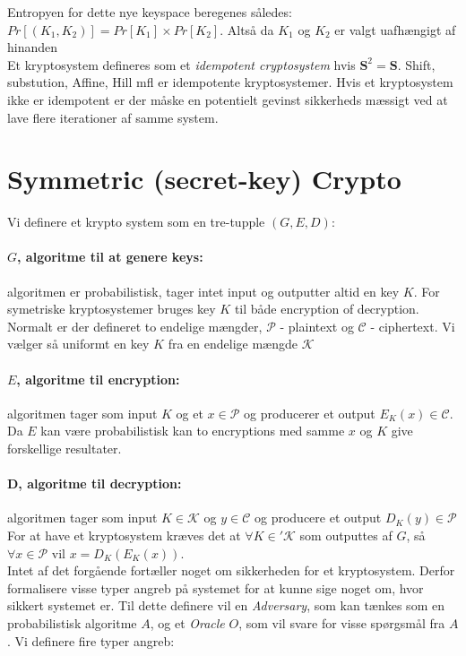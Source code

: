 \documentclass[paper=a4, fontsize=11pt]{scrartcl} %
\numberwithin{equation}{section} %
\numberwithin{figure}{section} %
\numberwithin{table}{section} %
\begin{document}
	Entropyen for dette nye keyspace beregenes således: $Pr[(K_1,K_2)]=Pr[K_1]\times Pr[K_2]$. Altså da $K_1$ og $K_2$ er valgt uafhængigt af hinanden \\
	
	Et kryptosystem defineres som et \textit{idempotent cryptosystem} hvis $\mathbf{S}^2=\mathbf{S}$. Shift, substution, Affine, Hill mfl er idempotente kryptosystemer. Hvis et kryptosystem ikke er idempotent er der måske en potentielt gevinst sikkerheds mæssigt ved at lave flere iterationer af samme system. 
	
	\newpage
	
	\section{Symmetric (secret-key) Crypto}
	
	Vi definere et krypto system som en tre-tupple $(G,E,D)$: 
	
	\paragraph{\textbf{$G$, algoritme til at genere keys:}} algoritmen er probabilistisk, tager intet input og outputter altid en key $K$. For symetriske kryptosystemer bruges key $K$ til både encryption of decryption. Normalt er der defineret to endelige mængder, $\mathcal{P}$ - plaintext og $\mathcal{C}$ - ciphertext. Vi vælger så uniformt en key $K$ fra en endelige mængde $\mathcal{K}$
	\paragraph{\textbf{$E$, algoritme til encryption:}} algoritmen tager som input $K$ og et $x\in\mathcal{P}$ og producerer et output $E_K(x)\in\mathcal{C}$. Da $E$ kan være probabilistisk kan to encryptions med samme $x$ og $K$ give forskellige resultater.
	\paragraph{\textbf{D, algoritme til decryption:}} algoritmen tager som input $K\in\mathcal{K}$ og $y\in\mathcal{C}$ og producere et output $D_K(y)\in\mathcal{P}$ \\

	For at have et kryptosystem kræves det at $\forall K\in\mathcal{'K}$ som outputtes af $G$, så $\forall x\in\mathcal{P}$	vil $x=D_K(E_K(x))$. \\
	
	Intet af det forgående fortæller noget om sikkerheden for et kryptosystem. Derfor formalisere visse typer angreb på systemet for at kunne sige noget om, hvor sikkert systemet er. Til dette definere vil en \textit{Adversary}, som kan tænkes som en probabilistisk algoritme $A$, og et \textit{Oracle} $O$, som vil svare for visse spørgsmål fra $A$. Vi definere fire typer angreb:
	
\end{document}
